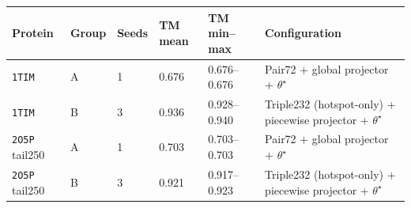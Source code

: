 \begin{tabular}{llllll}
\toprule
Protein & Group & Seeds & TM mean & TM min--max & Configuration \\
\midrule
\texttt{1TIM} & A & 1 & 0.676 & 0.676--0.676 & Pair72 + global projector + $\theta^\star$ \\
\texttt{1TIM} & B & 3 & 0.936 & 0.928--0.940 & Triple232 (hotspot-only) + piecewise projector + $\theta^\star$ \\
\texttt{2O5P} tail250 & A & 1 & 0.703 & 0.703--0.703 & Pair72 + global projector + $\theta^\star$ \\
\texttt{2O5P} tail250 & B & 3 & 0.921 & 0.917--0.923 & Triple232 (hotspot-only) + piecewise projector + $\theta^\star$ \\
\bottomrule
\end{tabular}
